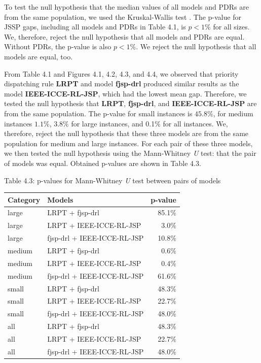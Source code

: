 To test the null hypothesis that the median values of all models and PDRs are from the same population, we used the Kruskal-Wallis test \cite{doi:10.1080/01621459.1952.10483441}. The p-value for JSSP gaps, including all models and PDRs in Table 4.1, is $p < 1\%$ for all sizes. We, therefore, reject the null hypothesis that all models and PDRs are equal. Without PDRs, the p-value is also $p < 1\%$. We reject the null hypothesis that all models are equal, too.
\par
From Table 4.1 and Figures 4.1, 4.2, 4.3, and 4.4, we observed that priority dispatching rule \textbf{LRPT} and model \textbf{fjsp-drl} produced similar results as the model \textbf{IEEE-ICCE-RL-JSP}, which had the lowest mean gap. Therefore, we tested the null hypothesis that \textbf{LRPT}, \textbf{fjsp-drl}, and \textbf{IEEE-ICCE-RL-JSP} are from the same population. The p-value for small instances is $45.8\%$, for medium instances $1.1\%$, $3.8\%$ for large instances, and 0.1$\%$ for all instances. We, therefore, reject the null hypothesis that these three models are from the same population for medium and large instances.
For each pair of these three models, we then tested the null hypothesis using the Mann-Whitney \textit{U} test: that the pair of models was equal. Obtained p-values are shown in Table 4.3.

\begin{table}[H]
    Table 4.3: p-values for Mann-Whitney \textit{U} test between pairs of models\\
    \vspace{1mm}
    \begin{tabular}{llr}
    \toprule
    Category & Models & p-value \\
    \midrule
    large & LRPT + fjsp-drl & 85.1$\%$ \\
    large & LRPT + IEEE-ICCE-RL-JSP & 3.0$\%$ \\
    large & fjsp-drl + IEEE-ICCE-RL-JSP & 10.8$\%$ \\
    medium & LRPT + fjsp-drl & 0.6$\%$ \\
    medium & LRPT + IEEE-ICCE-RL-JSP & 0.4$\%$ \\
    medium & fjsp-drl + IEEE-ICCE-RL-JSP & 61.6$\%$ \\
    small & LRPT + fjsp-drl & 48.3$\%$ \\
    small & LRPT + IEEE-ICCE-RL-JSP & 22.7$\%$ \\
    small & fjsp-drl + IEEE-ICCE-RL-JSP & 48.0$\%$ \\
    all & LRPT + fjsp-drl & 48.3$\%$ \\
    all & LRPT + IEEE-ICCE-RL-JSP & 22.7$\%$ \\
    all & fjsp-drl + IEEE-ICCE-RL-JSP & 48.0$\%$ \\
    \bottomrule
    \end{tabular}
\end{table}


